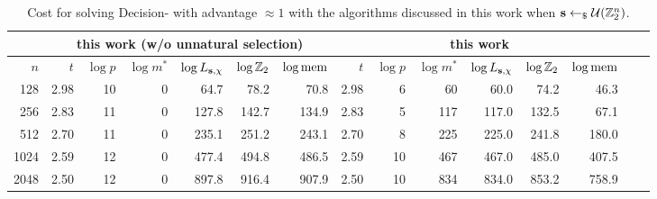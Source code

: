 {\begin{table}
\centering{}
\begin{tabular}{|r||r|r|r|r|r|r||r|r|r|r|r|r|r|r|}
\hline
   & \multicolumn{6}{|c||}{this work (w/o unnatural selection)} & \multicolumn{6}{|c|}{this work}\\
\hline
$n$ & $t$ & $\log p$ & $\log m^\ast$ & $\log L_{\mathbf{s},\chi}$ & $\log \mathbb{Z}_2$ & $\log \textnormal{mem}$ & $t$ & $\log p$ & $\log m^\ast$ & $\log L_{\mathbf{s},\chi}$ & $\log \mathbb{Z}_2$ & $\log \textnormal{mem}$\\
\hline
 128 &  2.98 & 10 &    0 &     64.7 &     78.2 &     70.8  & 2.98 &  6 &   60 &     60.0 &     74.2 &     46.3\\ %
 256 &  2.83 & 11 &    0 &    127.8 &    142.7 &    134.9  & 2.83 &  5 &  117 &    117.0 &    132.5 &     67.1\\ %
 512 &  2.70 & 11 &    0 &    235.1 &    251.2 &    243.1  & 2.70 &  8 &  225 &    225.0 &    241.8 &    180.0\\ %
1024 &  2.59 & 12 &    0 &    477.4 &    494.8 &    486.5  & 2.59 & 10 &  467 &    467.0 &    485.0 &    407.5\\ %
2048 &  2.50 & 12 &    0 &    897.8 &    916.4 &    907.9  & 2.50 & 10 &  834 &    834.0 &    853.2 &    758.9\\ %
\hline
\end{tabular}
\caption{Cost for solving Decision-\LWE{} with advantage $\approx 1$ with the algorithms discussed in this work when $\mathbf{s} \leftarrow_{\$} \mathcal{U}(\mathbb{Z}_2^n)$.}
\label{tab:thiswork}
\end{table}
}


